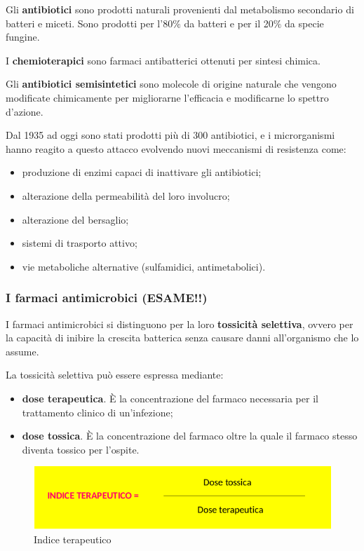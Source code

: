 \documentclass[11pt]{book}
\begin{document}
\vspace{1em}
Gli \textbf{antibiotici} sono prodotti naturali provenienti dal metabolismo secondario di batteri e miceti. Sono prodotti per l’80$\%$ da batteri e per il 20$\%$ da specie fungine.

I \textbf{chemioterapici} sono farmaci antibatterici ottenuti per sintesi chimica.

Gli \textbf{antibiotici semisintetici} sono molecole di origine naturale che vengono modificate chimicamente per migliorarne l’efficacia e modificarne lo spettro d’azione.

\vspace{1em}
Dal 1935 ad oggi sono stati prodotti più di 300 antibiotici, e i microrganismi hanno reagito a questo attacco evolvendo nuovi meccanismi di resistenza come:
\begin{itemize}
\item produzione di enzimi capaci di inattivare gli antibiotici;
\item alterazione della permeabilità del loro involucro;
\item alterazione del bersaglio;
\item sistemi di trasporto attivo;
\item vie metaboliche alternative (sulfamidici, antimetabolici).
\end{itemize}
                                                  


\subsubsection{I farmaci antimicrobici (ESAME!!)}
I farmaci antimicrobici si distinguono per la loro \textbf{tossicità selettiva}, ovvero per la capacità di inibire la crescita batterica senza causare danni all’organismo che lo assume. 

La tossicità selettiva può essere espressa mediante: 
\begin{itemize}
\item \textbf{dose terapeutica}. \`E la concentrazione del farmaco necessaria per il trattamento clinico di un’infezione;
\item \textbf{dose tossica}. \`E la concentrazione del farmaco oltre la quale il farmaco stesso diventa tossico per l’ospite.
\end{itemize}

\begin{figure}[htp]
\centering
\includegraphics[scale=0.45]{img/Indice terapeutico.png}
\caption{Indice terapeutico}
\label{}
\end{figure}
\end{document}
